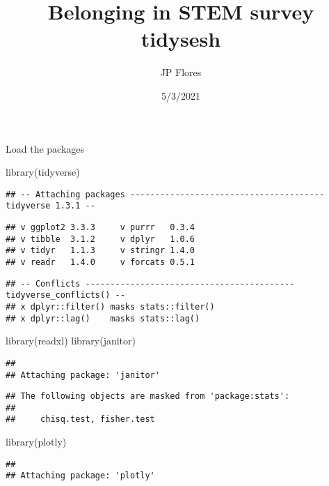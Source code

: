 \documentclass[
]{article}
\title{Belonging in STEM survey tidysesh}
\author{JP Flores}
\date{5/3/2021}
\newenvironment{Shaded}{\begin{snugshade}}{\end{snugshade}}
\newcommand{\FunctionTok}[1]{\textcolor[rgb]{0.00,0.00,0.00}{#1}}
\newcommand{\NormalTok}[1]{#1}
\begin{document}
\maketitle

Load the packages

\begin{Shaded}
\begin{Highlighting}[]
\FunctionTok{library}\NormalTok{(tidyverse)}
\end{Highlighting}
\end{Shaded}

\begin{verbatim}
## -- Attaching packages --------------------------------------- tidyverse 1.3.1 --
\end{verbatim}

\begin{verbatim}
## v ggplot2 3.3.3     v purrr   0.3.4
## v tibble  3.1.2     v dplyr   1.0.6
## v tidyr   1.1.3     v stringr 1.4.0
## v readr   1.4.0     v forcats 0.5.1
\end{verbatim}

\begin{verbatim}
## -- Conflicts ------------------------------------------ tidyverse_conflicts() --
## x dplyr::filter() masks stats::filter()
## x dplyr::lag()    masks stats::lag()
\end{verbatim}

\begin{Shaded}
\begin{Highlighting}[]
\FunctionTok{library}\NormalTok{(readxl)}
\FunctionTok{library}\NormalTok{(janitor)}
\end{Highlighting}
\end{Shaded}

\begin{verbatim}
## 
## Attaching package: 'janitor'
\end{verbatim}

\begin{verbatim}
## The following objects are masked from 'package:stats':
## 
##     chisq.test, fisher.test
\end{verbatim}

\begin{Shaded}
\begin{Highlighting}[]
\FunctionTok{library}\NormalTok{(plotly)}
\end{Highlighting}
\end{Shaded}

\begin{verbatim}
## 
## Attaching package: 'plotly'
\end{verbatim}
\end{document}
